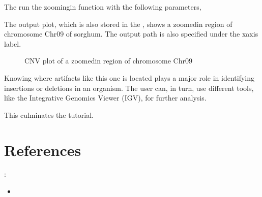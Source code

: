 \documentclass[letterpaper,10pt,english]{sphinxhowto}
\begin{document}
\sphinxAtStartPar
The run the zooming\sphinxhyphen{}in function with the following parameters,

\begin{sphinxVerbatim}[commandchars=\\\{\}]
 \PYG{p}{[} \PYG{p}{]}           
\end{sphinxVerbatim}

\sphinxAtStartPar
The output plot, which is also stored in the , shows a zoomed\sphinxhyphen{}in region of chromosome Chr09 of sorghum. The output path is also specified under the x\sphinxhyphen{}axis label.

\begin{figure}[htbp]
\centering
\capstart

\noindent{}
\caption{CNV plot of a zoomed\sphinxhyphen{}in region of chromosome Chr09}\label{\detokenize{index:id7}}\end{figure}

\sphinxAtStartPar
Knowing where artifacts like this one is located plays a major role in identifying insertions or deletions in an organism. The user can, in turn, use different tools, like the Integrative Genomics Viewer (IGV), for further analysis.

\sphinxAtStartPar
This culminates the tutorial.


\section{References}
\label{\detokenize{index:references}}
\sphinxAtStartPar
{}:
\begin{itemize}
\item {} 
\sphinxAtStartPar
{}

\end{itemize}
\end{document}
